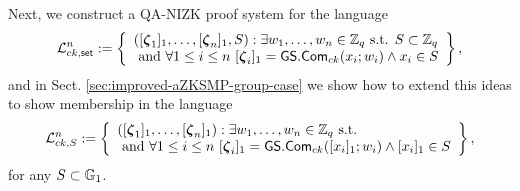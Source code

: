 Next, we construct a QA-NIZK proof system for the language
$$
\Lang_{ck,\mathsf{set}}^n:=\left\{\begin{array}{l}
([\grkb{\zeta}_1]_1,\ldots,[\grkb{\zeta}_n]_1,S):\exists w_1,\ldots,w_n\in\Z_q \text{ s.t. } S\subset\Z_q\\
\text{ and } \forall 1\leq i\leq n\ [\grkb{\zeta}_i]_1=\GS.\Com_{ck}(x_i;w_i)\wedge x_i\in S
\end{array}\right\},
$$
and in Sect. \ref{sec:improved-aZKSMP-group-case} we show how to extend this ideas to show membership in the language
$$
\Lang_{ck,S}^n:=\left\{\begin{array}{l}
([\grkb{\zeta}_1]_1,\ldots,[\grkb{\zeta}_n]_1):\exists w_1,\ldots,w_n\in\Z_q \text{ s.t. } \\
\text{ and } \forall 1\leq i\leq n\ [\grkb{\zeta}_i]_1=\GS.\Com_{ck}([x_i]_1;w_i)\wedge [x_i]_1\in S
\end{array}\right\},
$$
for any $S\subset\mathbb{G}_1$.

